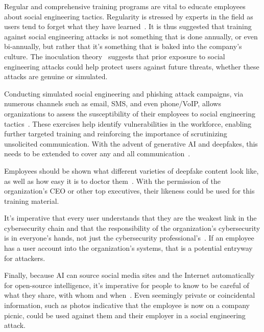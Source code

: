 Regular and comprehensive training programs are vital to educate employees about social engineering tactics. Regularity is stressed by experts in the field as users tend to forget what they have learned~\citep{hadnagy_Social_Engineering_The_Science_2018, mitnick_The_Art_of_Deception_2003}. It is thus suggested that training against social engineering attacks is not something that is done annually, or even bi-annually, but rather that it's something that is baked into the company's culture. The inoculation theory~\citep{blauth_AI_Crime_Overview_Malicious_Use_Abuse_2022} suggests that prior exposure to social engineering attacks could help protect users against future threats, whether these attacks are genuine or simulated.

Conducting simulated social engineering and phishing attack campaigns, via numerous channels such as email, SMS, and even phone/VoIP, allows organizations to assess the susceptibility of their employees to social engineering tactics~\citep{hadnagy_Social_Engineering_The_Science_2018}. These exercises help identify vulnerabilities in the workforce, enabling further targeted training and reinforcing the importance of scrutinizing unsolicited communication. With the advent of generative AI and deepfakes, this needs to be extended to cover any and all communication~\citep{mirsky_Creation_Detection_Deepfakes_2021}.

Employees should be shown what different varieties of deepfake content look like, as well as how easy it is to doctor them~\citep{mirsky_Creation_Detection_Deepfakes_2021}. With the permission of the organization’s CEO or other top executives, their likeness could be used for this training material.

It's imperative that every user understands that they are the weakest link in the cybersecurity chain and that the responsibility of the organization's cybersecurity is in everyone's hands, not just the cybersecurity professional's~\citep{mitnick_The_Art_of_Deception_2003}. If an employee has a user account into the organization’s systems, that is a potential entryway for attackers.

Finally, because AI can source social media sites and the Internet automatically for open-source intelligence, it's imperative for people to know to be careful of what they share, with whom and when~\citep{mitnick_The_Art_of_Deception_2003}. Even seemingly private or coincidental information, such as photos indicative that the employee is now on a company picnic, could be used against them and their employer in a social engineering attack.
